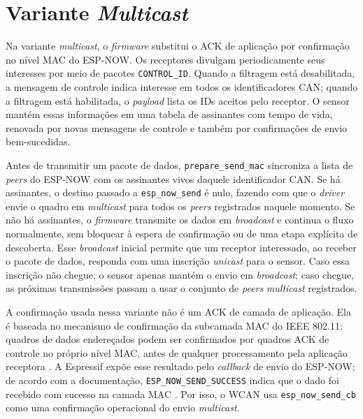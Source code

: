 \section{Variante \emph{Multicast}}

Na variante \emph{multicast}, o \emph{firmware} substitui o ACK de aplicação por confirmação no
nível MAC do ESP-NOW. Os receptores divulgam periodicamente seus interesses por
meio de pacotes \texttt{CONTROL\_ID}. Quando a filtragem está desabilitada, a
mensagem de controle indica interesse em todos os identificadores CAN; quando a filtragem está
habilitada, o \emph{payload} lista os IDs aceitos pelo receptor. O sensor mantém essas
informações em uma tabela de assinantes com tempo de vida, renovada por novas
mensagens de controle e também por confirmações de envio bem-sucedidas.

Antes de transmitir um pacote de dados, \texttt{prepare\_send\_mac} sincroniza a
lista de \emph{peers} do ESP-NOW com os assinantes vivos daquele identificador CAN. Se há
assinantes, o destino passado a \texttt{esp\_now\_send} é nulo, fazendo com que o
\emph{driver} envie o quadro em \emph{multicast} para todos os \emph{peers} registrados naquele
momento. Se não há assinantes, o \emph{firmware} transmite os dados em \emph{broadcast} e
continua o fluxo normalmente, sem bloquear à espera de confirmação ou de uma
etapa explícita de descoberta. Esse \emph{broadcast} inicial permite que um receptor
interessado, ao receber o pacote de dados, responda com uma inscrição \emph{unicast}
para o sensor. Caso essa inscrição não chegue, o sensor apenas mantém o envio em
\emph{broadcast}; caso chegue, as próximas transmissões passam a usar o conjunto de
\emph{peers} \emph{multicast} registrados.

A confirmação usada nessa variante não é um ACK de camada de aplicação. Ela é
baseada no mecanismo de confirmação da subcamada MAC do IEEE 802.11: quadros de
dados endereçados podem ser confirmados por quadros ACK de controle no próprio
nível MAC, antes de qualquer processamento pela aplicação receptora
\cite{ieee80211_2024}. A Espressif expõe esse resultado pelo \emph{callback} de envio do
ESP-NOW; de acordo com a documentação, \texttt{ESP\_NOW\_SEND\_SUCCESS} indica
que o dado foi recebido com sucesso na camada MAC \cite{espressif_espnow_programming_guide}.
Por isso, o WCAN usa \texttt{esp\_now\_send\_cb} como uma confirmação operacional
do envio \emph{multicast}.

